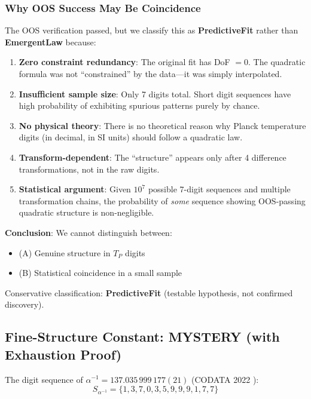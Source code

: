 \documentclass[twocolumn,showpacs,preprintnumbers,amsmath,amssymb,prl]{revtex4-2}
\begin{document}
\subsubsection{Why OOS Success May Be Coincidence}

The OOS verification passed, but we classify this as \textbf{PredictiveFit} rather than \textbf{EmergentLaw} because:

\begin{enumerate}
    \item \textbf{Zero constraint redundancy}: The original fit has DoF $= 0$. The quadratic formula was not ``constrained'' by the data---it was simply interpolated.
    
    \item \textbf{Insufficient sample size}: Only 7 digits total. Short digit sequences have high probability of exhibiting spurious patterns purely by chance.
    
    \item \textbf{No physical theory}: There is no theoretical reason why Planck temperature digits (in decimal, in SI units) should follow a quadratic law.
    
    \item \textbf{Transform-dependent}: The ``structure'' appears only after 4 difference transformations, not in the raw digits.
    
    \item \textbf{Statistical argument}: Given $10^7$ possible 7-digit sequences and multiple transformation chains, the probability of \textit{some} sequence showing OOS-passing quadratic structure is non-negligible.
\end{enumerate}

\textbf{Conclusion}: We cannot distinguish between:
\begin{itemize}
    \item (A) Genuine structure in $T_P$ digits
    \item (B) Statistical coincidence in a small sample
\end{itemize}

Conservative classification: \textbf{PredictiveFit} (testable hypothesis, not confirmed discovery).

\subsection{Fine-Structure Constant: MYSTERY (with Exhaustion Proof)}

The digit sequence of $\alpha^{-1} = 137.035\,999\,177(21)$ (CODATA 2022 \cite{nist_alpha}):
\begin{equation}
    S_{\alpha^{-1}} = \{1, 3, 7, 0, 3, 5, 9, 9, 9, 1, 7, 7\}
\end{equation}
\end{document}
